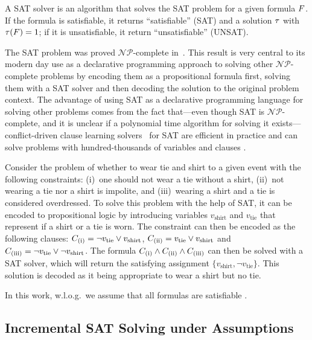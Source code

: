 A SAT solver is an algorithm that solves the SAT problem for a given formula $F$.
If the formula is satisfiable, it returns ``satisfiable'' (SAT) and a solution $\tau$ with $\tau(F)=1$;
if it is unsatisfiable, it return ``unsatisfiable'' (UNSAT).

The SAT problem was proved $\mathcal{NP}$-complete in~\textcite{DBLP:conf/stoc/Cook71}.
This result is very central to its modern day use as a declarative programming approach to solving other $\mathcal{NP}$-complete problems by encoding them as a propositional formula first, solving them with a SAT solver and then decoding the solution to the original problem context.
The advantage of using SAT as a declarative programming language for solving other problems comes from the fact that---even though SAT is $\mathcal{NP}$-complete, and it is unclear if a polynomial time algorithm for solving it exists---conflict-driven clause learning solvers~\autocite{handbook2-cdcl} for SAT are efficient in practice and can solve problems with hundred-thousands of variables and clauses .
\begin{example}
  Consider the problem of whether to wear tie and shirt to a given event with the following constraints:
  (i)~one should not wear a tie without a shirt, (ii)~not wearing a tie nor a shirt is impolite, and (iii)~wearing a shirt and a tie is considered overdressed.
  To solve this problem with the help of SAT, it can be encoded to propositional logic by introducing variables $v_\text{shirt}$ and $v_\text{tie}$ that represent if a shirt or a tie is worn.
  The constraint can then be encoded as the following clauses:
  $C_\text{(i)} = \lnot v_\text{tie} \lor v_\text{shirt}$, $C_\text{(ii)} = v_\text{tie} \lor v_\text{shirt}$ and $C_\text{(iii)} = \lnot v_\text{tie} \lor \lnot v_\text{shirt}$.
  The formula $C_\text{(i)} \land C_\text{(ii)} \land C_\text{(iii)}$ can then be solved with a SAT solver, which will return the satisfying assignment $\{ v_\text{shirt}, \lnot v_\text{tie} \}$.
  This solution is decoded as it being appropriate to wear a shirt but no tie.
\end{example}

In this work, w.l.o.g.\ we assume that all formulas are satisfiable .

\subsection{Incremental SAT Solving under Assumptions\label{sec:inc-sat}}


